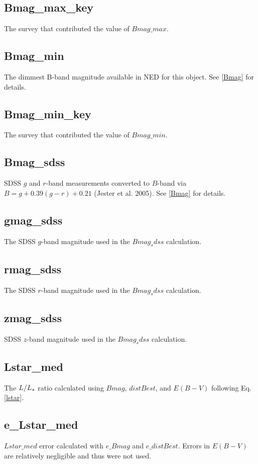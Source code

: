 \documentclass[iop]{emulateapj-rtx4}
\begin{document}
\subsection{Bmag\_max\_key}
The survey that contributed the value of $Bmag\_max$.

\subsection{Bmag\_min}
The dimmest B-band magnitude available in NED for this object. See \ref{Bmag} for details.

\subsection{Bmag\_min\_key}
The survey that contributed the value of $Bmag\_min$.

\subsection{Bmag\_sdss}
SDSS $g$ and $r$-band measurements converted to $B$-band via $B = g + 0.39 (g-r) + 0.21$ (Jester et al. 2005). See \ref{Bmag} for details.

\subsection{gmag\_sdss}
The SDSS $g$-band magnitude used in the $Bmag_sdss$ calculation.

\subsection{rmag\_sdss}
The SDSS $r$-band magnitude used in the $Bmag_sdss$ calculation. 

\subsection{zmag\_sdss}
SDSS $z$-band magnitude used in the $Bmag_sdss$ calculation.

\subsection{Lstar\_med}
The $L / L_{\**}$ ratio calculated using $Bmag$, $distBest$, and $E(B-V)$ following Eq. \ref{lstar}.

\subsection{e\_Lstar\_med}
$Lstar\_med$ error calculated with $e\_Bmag$ and $e\_distBest$. Errors in $E(B-V)$ are relatively negligible and thus were not used.
\end{document}
